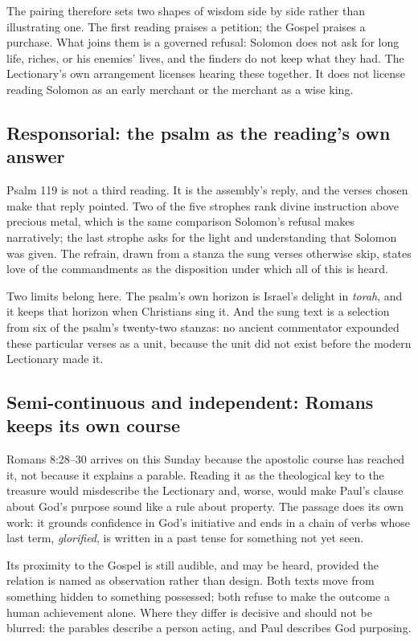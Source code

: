 The pairing therefore sets two shapes of wisdom side by side rather than illustrating one. The first reading praises a petition; the Gospel praises a purchase. What joins them is a governed refusal: Solomon does not ask for long life, riches, or his enemies' lives, and the finders do not keep what they had. The Lectionary's own arrangement licenses hearing these together. It does not license reading Solomon as an early merchant or the merchant as a wise king.

\subsection*{Responsorial: the psalm as the reading's own answer}

Psalm 119 is not a third reading. It is the assembly's reply, and the verses chosen make that reply pointed. Two of the five strophes rank divine instruction above precious metal, which is the same comparison Solomon's refusal makes narratively; the last strophe asks for the light and understanding that Solomon was given. The refrain, drawn from a stanza the sung verses otherwise skip, states love of the commandments as the disposition under which all of this is heard.

Two limits belong here. The psalm's own horizon is Israel's delight in \emph{torah}, and it keeps that horizon when Christians sing it. And the sung text is a selection from six of the psalm's twenty-two stanzas: no ancient commentator expounded these particular verses as a unit, because the unit did not exist before the modern Lectionary made it.

\subsection*{Semi-continuous and independent: Romans keeps its own course}

Romans 8:28--30 arrives on this Sunday because the apostolic course has reached it, not because it explains a parable. Reading it as the theological key to the treasure would misdescribe the Lectionary and, worse, would make Paul's clause about God's purpose sound like a rule about property. The passage does its own work: it grounds confidence in God's initiative and ends in a chain of verbs whose last term, \emph{glorified}, is written in a past tense for something not yet seen.

Its proximity to the Gospel is still audible, and may be heard, provided the relation is named as observation rather than design. Both texts move from something hidden to something possessed; both refuse to make the outcome a human achievement alone. Where they differ is decisive and should not be blurred: the parables describe a person acting, and Paul describes God purposing.

